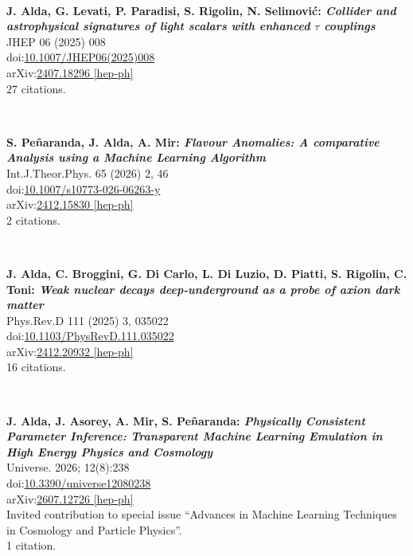 \documentclass[12pt, a4paper]{article}
\begin{document}
~

\textbf{J. Alda, G. Levati, P. Paradisi, S. Rigolin, N. Selimovi\'c: \textit{Collider and astrophysical signatures of light scalars with enhanced $\tau$ couplings}}\\
JHEP 06 (2025) 008\\
doi:\href{https://doi.org/10.1007/JHEP06(2025)008}{10.1007/JHEP06(2025)008}\\
arXiv:\href{https://arxiv.org/abs/2407.18296}{2407.18296  [hep-ph]}\\
27 citations.

~

\textbf{S. Pe\~naranda, J. Alda, A. Mir: \textit{Flavour Anomalies: A comparative Analysis using a Machine Learning Algorithm}}\\
Int.J.Theor.Phys. 65 (2026) 2, 46\\
doi:\href{https://doi.org/10.1007/s10773-026-06263-y}{10.1007/s10773-026-06263-y}\\
arXiv:\href{https://arxiv.org/abs/2412.15830}{2412.15830 [hep-ph]}\\
2 citations.

~

\textbf{J. Alda, C. Broggini, G. Di Carlo, L. Di Luzio, D. Piatti, S. Rigolin, C. Toni: \textit{Weak nuclear decays deep-underground as a probe of axion dark matter}}\\
Phys.Rev.D 111 (2025) 3, 035022\\
doi:\href{https://doi.org/10.1103/PhysRevD.111.035022}{10.1103/PhysRevD.111.035022}\\
arXiv:\href{https://arxiv.org/abs/2412.20932}{2412.20932 [hep-ph]}\\
16 citations.


~

\textbf{J. Alda, J. Asorey, A. Mir, S. Pe\~naranda: \textit{Physically Consistent Parameter Inference: Transparent Machine Learning Emulation in High Energy Physics and Cosmology} }\\
Universe. 2026; 12(8):238\\
doi:\href{https://doi.org/10.3390/universe12080238 }{10.3390/universe12080238 }\\
arXiv:\href{https://arxiv.org/abs/2607.12726}{2607.12726 [hep-ph]}\\
Invited contribution to special issue ``Advances in Machine Learning Techniques in Cosmology and Particle Physics''.\\
1 citation.

~
\end{document}
